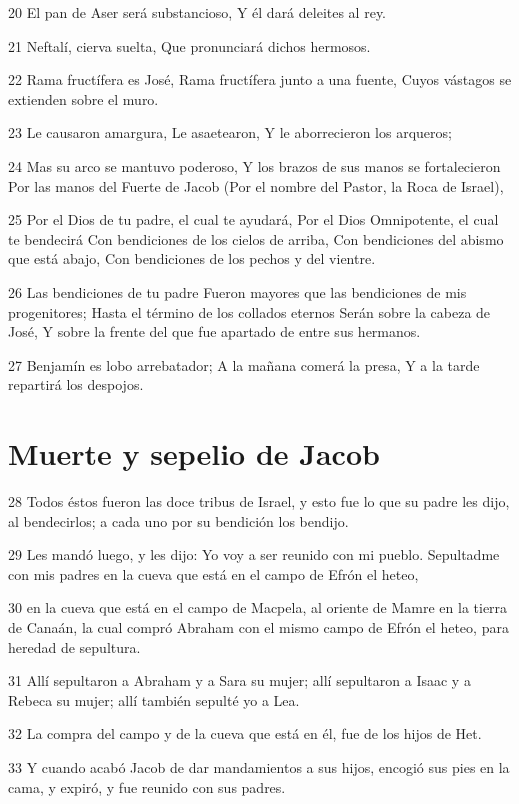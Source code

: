 20 El pan de Aser será substancioso,
Y él dará deleites al rey.

21 Neftalí, cierva suelta,
Que pronunciará dichos hermosos.

22 Rama fructífera es José,
Rama fructífera junto a una fuente,
Cuyos vástagos se extienden sobre el muro.

23 Le causaron amargura,
Le asaetearon,
Y le aborrecieron los arqueros;

24 Mas su arco se mantuvo poderoso,
Y los brazos de sus manos se fortalecieron
Por las manos del Fuerte de Jacob
(Por el nombre del Pastor, la Roca de Israel),

25 Por el Dios de tu padre, el cual te ayudará,
Por el Dios Omnipotente, el cual te bendecirá
Con bendiciones de los cielos de arriba,
Con bendiciones del abismo que está abajo,
Con bendiciones de los pechos y del vientre.

26 Las bendiciones de tu padre
Fueron mayores que las bendiciones de mis progenitores;
Hasta el término de los collados eternos
Serán sobre la cabeza de José,
Y sobre la frente del que fue apartado de entre sus hermanos.

27 Benjamín es lobo arrebatador;
A la mañana comerá la presa,
Y a la tarde repartirá los despojos.

\section{Muerte y sepelio de Jacob}

28 Todos éstos fueron las doce tribus de Israel, y esto fue lo que su padre les dijo, al bendecirlos; a cada uno por su bendición los bendijo.

29 Les mandó luego, y les dijo: Yo voy a ser reunido con mi pueblo. Sepultadme con mis padres en la cueva que está en el campo de Efrón el heteo,

30 en la cueva que está en el campo de Macpela, al oriente de Mamre en la tierra de Canaán, la cual compró Abraham con el mismo campo de Efrón el heteo, para heredad de sepultura.

31 Allí sepultaron a Abraham y a Sara su mujer; allí sepultaron a Isaac y a Rebeca su mujer; allí también sepulté yo a Lea.

32 La compra del campo y de la cueva que está en él, fue de los hijos de Het.

33 Y cuando acabó Jacob de dar mandamientos a sus hijos, encogió sus pies en la cama, y expiró, y fue reunido con sus padres.

